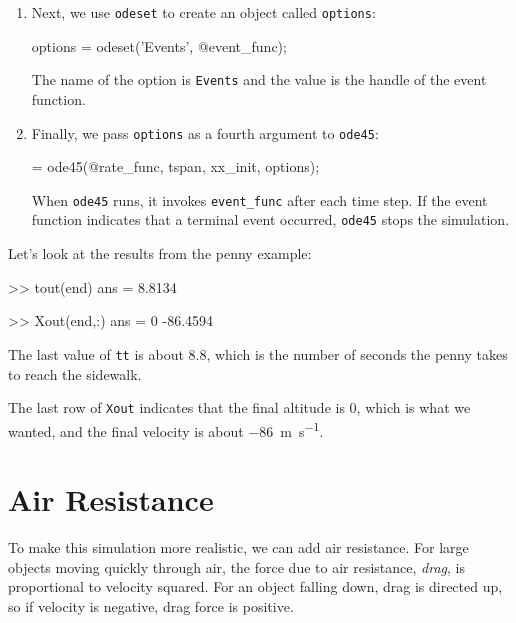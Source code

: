 \begin{enumerate}

\item Next, we use \lstinline{odeset} to create an object called \lstinline{options}:

\begin{code}
options = odeset('Events', @event_func);
\end{code}
%
The name of the option is \lstinline{Events} and the value is the handle of the event function.

\item Finally, we pass \lstinline{options} as a fourth argument to \lstinline{ode45}:

\begin{code}
 = ode45(@rate_func, tspan, xx_init, options);
\end{code}

When \lstinline{ode45} runs, it invokes \lstinline{event_func} after each time step.  If the event function indicates that a terminal event occurred,
\lstinline{ode45} stops the simulation.

\end{enumerate}

Let's look at the results from the penny example:

\begin{code}
    >> tout(end)
    ans =
    8.8134
    
    >> Xout(end,:)
    ans =
             0  -86.4594
\end{code}

The last value of \lstinline{tt} is about 8.8, which is the number of seconds the penny takes to reach the sidewalk.

The last row of \lstinline{Xout} indicates that the final altitude is 0, which is what we wanted, and the final velocity is about \SI{-86}{\meter \per \second}.


\section{Air Resistance}
\label{air_resistance}


To make this simulation more realistic, we can add air resistance.
For large objects moving quickly through air, the force due to air resistance, \emph{drag}, is proportional to velocity squared.
For an object falling down, drag is
directed up, so if velocity is negative, drag force is positive.

